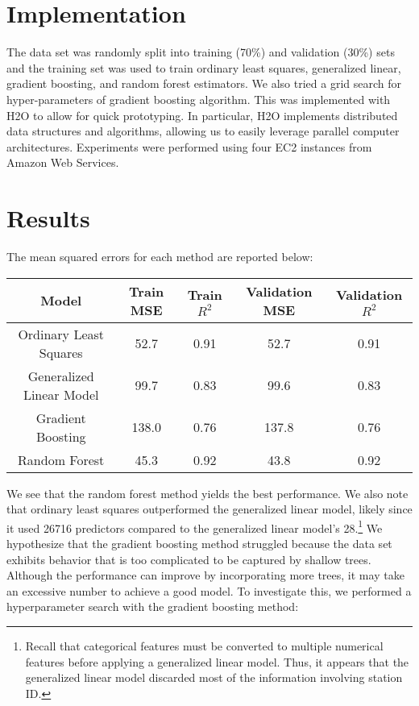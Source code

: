 \documentclass[letterpaper]{article}
\begin{document}
\section{Implementation}
The data set was randomly split into training (70\%) and validation
(30\%) sets and the training set was used to train ordinary least
squares, generalized linear, gradient boosting, and random forest
estimators. We also tried a grid search for hyper-parameters of gradient boosting algorithm. 
This was implemented with H2O to allow for quick
prototyping. In particular, H2O implements distributed data structures
and algorithms, allowing us to easily leverage parallel computer
architectures. Experiments were performed using four EC2 instances
from Amazon Web Services.

\section{Results}
The mean squared errors for each method are reported below:
\begin{table}[H]
  \centering
  \begin{tabular}{c|cccc}
    Model & Train MSE & Train \(R^2\) & Validation MSE & Validation \(R^2\) \\ \hline
    Ordinary Least Squares & 52.7 & 0.91 & 52.7 & 0.91 \\
    Generalized Linear Model & 99.7 & 0.83 & 99.6 & 0.83\\
    Gradient Boosting & 138.0 & 0.76 & 137.8 & 0.76 \\
    Random Forest & 45.3 & 0.92 & 43.8 & 0.92
  \end{tabular}
\end{table}
\noindent
We see that the random forest method yields the best performance. We
also note that ordinary least squares outperformed the generalized
linear model, likely since it used 26716 predictors compared to the
generalized linear model's 28.\footnote{Recall that categorical
  features must be converted to multiple numerical features before
  applying a generalized linear model. Thus, it appears that the
  generalized linear model discarded most of the information involving
  station ID.}  We hypothesize that the gradient boosting method
struggled because the data set exhibits behavior that is too
complicated to be captured by shallow trees. Although the performance
can improve by incorporating more trees, it may take an excessive
number to achieve a good model.  To investigate this, we performed a
hyperparameter search with the gradient boosting method:
\end{document}
